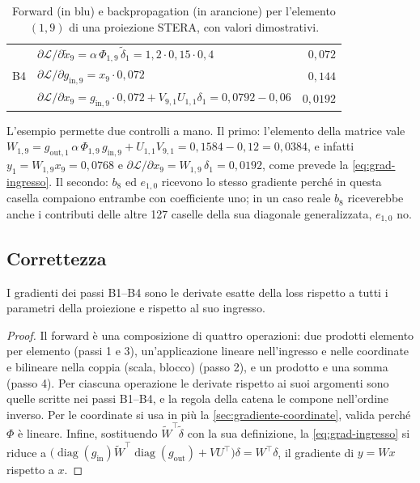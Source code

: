 \begin{table}[H]
\begin{tabular}{>{\raggedright\arraybackslash}p{12mm}>{\raggedright\arraybackslash}p{70mm}r}
\rowcolor{steraArancio!12} & $\partial\mathcal L/\partial\tilde x_9=\alpha\,\Phi_{1,9}\,\tilde\delta_1=1{,}2\cdot0{,}15\cdot0{,}4$ & $0{,}072$ \\
\rowcolor{steraArancio!12} B4 & $\partial\mathcal L/\partial g_{\mathrm{in},9}=x_9\cdot0{,}072$ & $0{,}144$ \\
\rowcolor{steraArancio!12} & $\partial\mathcal L/\partial x_9=g_{\mathrm{in},9}\cdot0{,}072+V_{9,1}U_{1,1}\delta_1=0{,}0792-0{,}06$ & $0{,}0192$ \\
\bottomrule
\end{tabular}
\caption{Forward (in blu) e backpropagation (in arancione) per l'elemento $(1,9)$ di una proiezione STERA, con valori dimostrativi.}
\label{tab:esempio-backward}
\end{table}

L'esempio permette due controlli a mano. Il primo: l'elemento della matrice vale $W_{1,9}=g_{\mathrm{out},1}\,\alpha\,\Phi_{1,9}\,g_{\mathrm{in},9}+U_{1,1}V_{9,1}=0{,}1584-0{,}12=0{,}0384$, e infatti $y_1=W_{1,9}x_9=0{,}0768$ e $\partial\mathcal L/\partial x_9=W_{1,9}\,\delta_1=0{,}0192$, come prevede la \eqref{eq:grad-ingresso}. Il secondo: $b_8$ ed $e_{1,0}$ ricevono lo stesso gradiente perché in questa casella compaiono entrambe con coefficiente uno; in un caso reale $b_8$ riceverebbe anche i contributi delle altre 127 caselle della sua diagonale generalizzata, $e_{1,0}$ no.

\subsection{Correttezza}
\label{sec:correttezza-backward}

\begin{proposizione}
\label{prop:backward-esatto}
I gradienti dei passi B1--B4 sono le derivate esatte della loss rispetto a tutti i parametri della proiezione e rispetto al suo ingresso.
\end{proposizione}

\begin{proof}
Il forward è una composizione di quattro operazioni: due prodotti elemento per elemento (passi 1 e 3), un'applicazione lineare nell'ingresso e nelle coordinate e bilineare nella coppia (scala, blocco) (passo 2), e un prodotto e una somma (passo 4). Per ciascuna operazione le derivate rispetto ai suoi argomenti sono quelle scritte nei passi B1--B4, e la regola della catena le compone nell'ordine inverso. Per le coordinate si usa in più la \autoref{sec:gradiente-coordinate}, valida perché $\Phi$ è lineare. Infine, sostituendo $\widetilde W^\top\tilde\delta$ con la sua definizione, la \eqref{eq:grad-ingresso} si riduce a $\big(\operatorname{diag}(g_{\mathrm{in}})\widetilde W^\top\operatorname{diag}(g_{\mathrm{out}})+VU^\top\big)\delta=W^\top\delta$, il gradiente di $y=Wx$ rispetto a $x$.
\end{proof}

